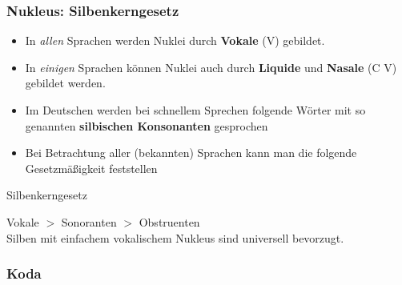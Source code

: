 \begin{frame}
\frametitle{Nukleus: Silbenkerngesetz}

\begin{itemize}

	\item In \emph{allen} Sprachen werden Nuklei durch \textbf{Vokale} (V) gebildet.
	
	\item In \emph{einigen} Sprachen können Nuklei auch durch \textbf{Liquide} und \textbf{Nasale} (C \vs V) gebildet werden.

	\item Im Deutschen werden bei schnellem Sprechen folgende Wörter mit so genannten \textbf{silbischen Konsonanten} gesprochen
	
	\begin{multicols}{2}
          \ea
          \z
          
          \ea
           
          \z
	\end{multicols}

\pause 

	\item Bei Betrachtung aller (bekannten) Sprachen kann man die folgende Gesetzmäßigkeit feststellen \citep[cf.][217f.]{Hall00a}

\end{itemize}
	
	\begin{block}{Silbenkerngesetz}
		
	Vokale $>$ Sonoranten $>$ Obstruenten\\
	Silben mit einfachem vokalischem Nukleus sind universell bevorzugt.
	\end{block}
	
\end{frame}



\subsubsection{Koda}

